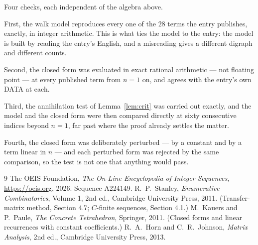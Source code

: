\documentclass[11pt,a4paper]{article}
\theoremstyle{plain}
\theoremstyle{definition}
\begin{document}
Four checks, each independent of the algebra above.

First, the walk model reproduces every one of the $28$ terms the entry publishes,
exactly, in integer arithmetic. This is what ties the model to the entry: the model is built
by reading the entry's English, and a misreading gives a different digraph and different
counts.

Second, the closed form was evaluated in exact rational arithmetic --- not floating point ---
at every published term from $n=1$ on, and agrees with the entry's own DATA at each.

Third, the annihilation test of Lemma~\ref{lem:crit} was carried out exactly, and the model
and the closed form were then compared directly at sixty consecutive indices beyond
$n=1$, far past where the proof already settles the matter.

Fourth, the closed form was deliberately perturbed --- by a constant and by a term linear in
$n$ --- and each perturbed form was rejected by the same comparison, so the test is not one
that anything would pass.

\begin{thebibliography}{9}
 The OEIS Foundation, \emph{The On-Line Encyclopedia of Integer
Sequences}, \url{https://oeis.org}, 2026. Sequence A224149.
 R.~P.~Stanley, \emph{Enumerative Combinatorics}, Volume 1, 2nd ed.,
Cambridge University Press, 2011. (Transfer-matrix method, Section 4.7; $C$-finite sequences,
Section 4.1.)
 M.~Kauers and P.~Paule, \emph{The Concrete Tetrahedron}, Springer, 2011.
(Closed forms and linear recurrences with constant coefficients.)
 R.~A.~Horn and C.~R.~Johnson, \emph{Matrix Analysis}, 2nd ed., Cambridge
University Press, 2013.
\end{thebibliography}
\end{document}
